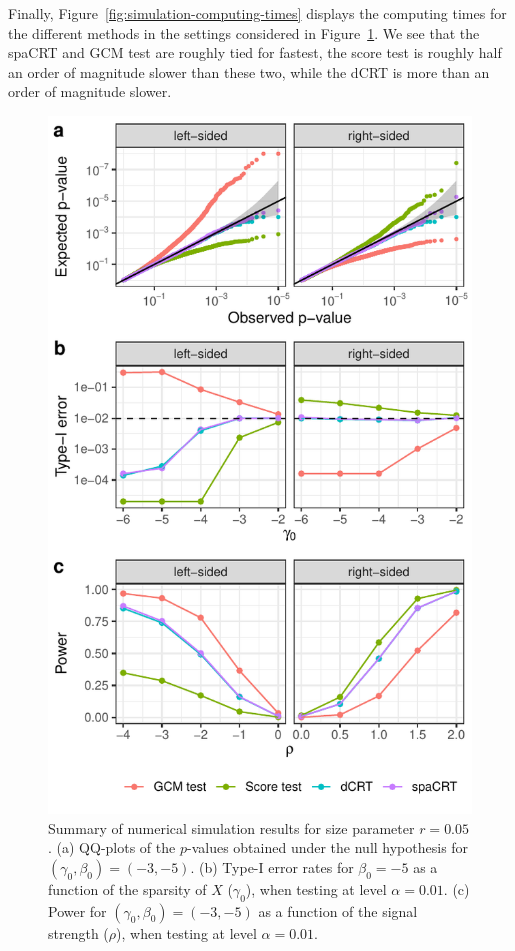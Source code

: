 \documentclass[12pt]{article}
\theoremstyle{definition}
\newcommand{\srx}{X}									%
\begin{document}
Finally, Figure~\ref{fig:simulation-computing-times} displays the computing times for the different methods in the settings considered in Figure~\ref{fig:simulation-summary}. We see that the spaCRT and GCM test are roughly tied for fastest, the score test is roughly half an order of magnitude slower than these two, while the dCRT is more than an order of magnitude slower. 

\begin{figure}[h!]
	\centering
	\includegraphics{figures-and-tables/simulation-summary.pdf}
	\caption{Summary of numerical simulation results for size parameter $r = 0.05$. (a) QQ-plots of the $p$-values obtained under the null hypothesis for $(\gamma_0, \beta_0) = (-3, -5)$. (b) Type-I error rates for $\beta_0 = -5$ as a function of the sparsity of $\srx$ ($\gamma_0$), when testing at level $\alpha = 0.01$. (c) Power for $(\gamma_0, \beta_0) = (-3, -5)$ as a function of the signal strength ($\rho$), when testing at level $\alpha = 0.01$.}
	\label{fig:simulation-summary}
\end{figure}
\end{document}
